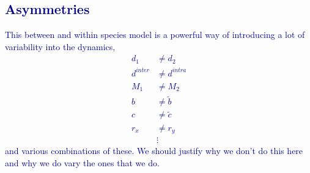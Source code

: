 \documentclass[12pt]{article}
\newcommand{\cha}[1]{\textcolor{darkblue}{#1}}
\begin{document}
\cha{\section*{Asymmetries}}

\cha{This between and within species model is a powerful way of introducing a lot of variability into the dynamics,
\begin{align}
	d_1 &\neq d_2 \\
	d^{inter} &\neq d^{intra} \\
	M_1 &\neq M_2 \\
	b &\neq \tilde{b} \\
	c &\neq \tilde{c} \\
	r_x &\neq r_y \\
	&\vdots
\end{align}
and various combinations of these. We should justify why we don't do this here and why we do vary the ones that we do.}


%
%
%
\end{document}
